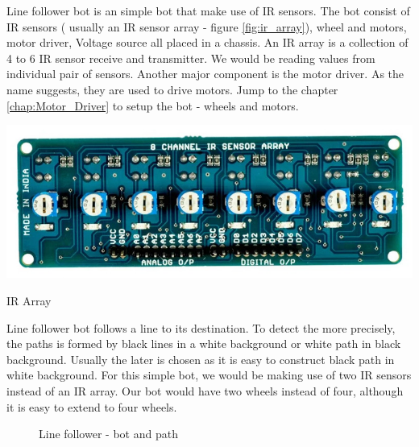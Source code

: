 \par Line follower bot is an simple bot that make use of \ac{IR} sensors. The bot consist of \ac{IR} sensors ( usually an \ac{IR} sensor array - figure \ref{fig:ir_array}), wheel and motors, motor driver, Voltage source all placed in a chassis. An \ac{IR} array is a collection of 4 to 6 \ac{IR} sensor receive and transmitter. We would be reading values from individual pair of sensors. Another major component is the motor driver. As the name suggests, they are used to drive motors. Jump to the chapter \ref{chap:Motor_Driver} to setup the bot - wheels and motors.

\begin{marginfigure}	
	\includegraphics{Images/IR Sensor/IR_array.png}
	\captionsetup{type=figure}
	\caption{\ac{IR} Array}
	\label{fig:ir_array}
\end{marginfigure}

Line follower bot follows a line to its destination. To detect the more precisely, the paths is formed by black lines in a white background or white path in black background. Usually the later is chosen as it is easy to construct black path in white background. For this simple bot, we would be making use of two \ac{IR} sensors instead of an \ac{IR} array. Our bot would have two wheels instead of four, although it is easy to extend to four wheels.

\begin{figure}
    \quad
    \caption{Line follower - bot and path}
\end{figure}

